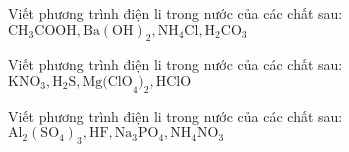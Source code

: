 \documentclass[Main.tex]{subfiles}
\begin{document}
\begin{bt}
Viết phương trình điện li trong nước của các chất sau: $\mathrm{CH}_3\mathrm{COOH}, \mathrm{Ba(OH)}_2, \mathrm{NH}_4\mathrm{Cl}, \mathrm{H}_2\mathrm{CO}_3$
\end{bt}

\begin{bt}
Viết phương trình điện li trong nước của các chất sau: $\mathrm{KNO}_3, \mathrm{H}_2\mathrm{S}, \mathrm{Mg(ClO}_4)_2, \mathrm{HClO}$
\end{bt}

\begin{bt}
Viết phương trình điện li trong nước của các chất sau: $\mathrm{Al}_2(\mathrm{SO}_4)_3, \mathrm{HF}, \mathrm{Na}_3\mathrm{PO}_4, \mathrm{NH}_4\mathrm{NO}_3$
\end{bt}
\end{document}
